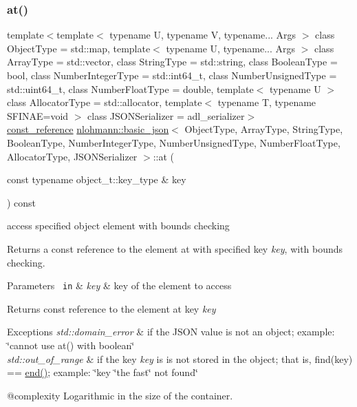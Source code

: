 \subsubsection{\texorpdfstring{at()}{at()}\hspace{0.1cm}{\footnotesize\ttfamily [4/6]}}
{\footnotesize\ttfamily template$<$template$<$ typename U, typename V, typename... Args $>$ class Object\+Type = std\+::map, template$<$ typename U, typename... Args $>$ class Array\+Type = std\+::vector, class String\+Type  = std\+::string, class Boolean\+Type  = bool, class Number\+Integer\+Type  = std\+::int64\+\_\+t, class Number\+Unsigned\+Type  = std\+::uint64\+\_\+t, class Number\+Float\+Type  = double, template$<$ typename U $>$ class Allocator\+Type = std\+::allocator, template$<$ typename T, typename S\+F\+I\+N\+A\+E=void $>$ class J\+S\+O\+N\+Serializer = adl\+\_\+serializer$>$ \\
\mbox{\hyperlink{classnlohmann_1_1basic__json_a4057c5425f4faacfe39a8046871786ca}{const\+\_\+reference}} \mbox{\hyperlink{classnlohmann_1_1basic__json}{nlohmann\+::basic\+\_\+json}}$<$ Object\+Type, Array\+Type, String\+Type, Boolean\+Type, Number\+Integer\+Type, Number\+Unsigned\+Type, Number\+Float\+Type, Allocator\+Type, J\+S\+O\+N\+Serializer $>$\+::at (\begin{DoxyParamCaption}\item[{const typename object\+\_\+t\+::key\+\_\+type \&}]{key }\end{DoxyParamCaption}) const\hspace{0.3cm}{\ttfamily [inline]}}



access specified object element with bounds checking 

Returns a const reference to the element at with specified key {\itshape key}, with bounds checking.


\begin{DoxyParams}[1]{Parameters}
\mbox{\texttt{ in}}  & {\em key} & key of the element to access\\
\hline
\end{DoxyParams}
\begin{DoxyReturn}{Returns}
const reference to the element at key {\itshape key} 
\end{DoxyReturn}

\begin{DoxyExceptions}{Exceptions}
{\em std\+::domain\+\_\+error} & if the J\+S\+ON value is not an object; example\+: {\ttfamily \char`\"{}cannot use at() with boolean\char`\"{}} \\
\hline
{\em std\+::out\+\_\+of\+\_\+range} & if the key {\itshape key} is is not stored in the object; that is, {\ttfamily find(key) == \mbox{\hyperlink{classnlohmann_1_1basic__json_a13e032a02a7fd8a93fdddc2fcbc4763c}{end()}}}; example\+: {\ttfamily \char`\"{}key \char`\"{}the fast\char`\"{} not found\char`\"{}}\\
\hline
\end{DoxyExceptions}
@complexity Logarithmic in the size of the container.

